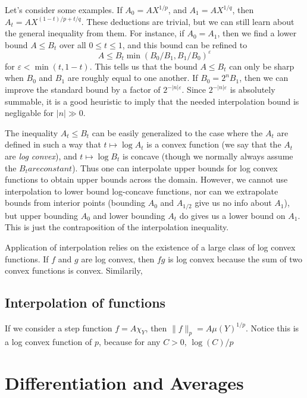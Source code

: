 Let's consider some examples. If $A_0 = AX^{1/p}$, and $A_1 = AX^{1/q}$, then $A_t = AX^{(1-t)/p + t/q}$. These deductions are trivial, but we can still learn about the general inequality from them. For instance, if $A_0 = A_1$, then we find a lower bound $A \leq B_t$ over all $0 \leq t \leq 1$, and this bound can be refined to
%
\[ A \leq B_t \min(B_0/B_1,B_1/B_0)^\varepsilon \]
%
for $\varepsilon < \min(t, 1-t)$. This tells us that the bound $A \leq B_t$ can only be sharp when $B_0$ and $B_1$ are roughly equal to one another. If $B_0 = 2^n B_1$, then we can improve the standard bound by a factor of $2^{-|n| \varepsilon}$. Since $2^{-|n| \varepsilon}$ is absolutely summable, it is a good heuristic to imply that the needed interpolation bound is negligable for $|n| \gg 0$.

The inequality $A_t \leq B_t$ can be easily generalized to the case where the $A_t$ are defined in such a way that $t \mapsto \log A_t$ is a convex function (we say that the $A_t$ are {\it log convex}), and $t \mapsto \log B_t$ is concave (though we normally always assume the $B_t are constant$). Thus one can interpolate upper bounds for log convex functions to obtain upper bounds across the domain. However, we cannot use interpolation to lower bound log-concave functions, nor can we extrapolate bounds from interior points (bounding $A_0$ and $A_{1/2}$ give us no info about $A_1$), but upper bounding $A_0$ and lower bounding $A_t$ do gives us a lower bound on $A_1$. This is just the contraposition of the interpolation inequality.

Application of interpolation relies on the existence of a large class of log convex functions. If $f$ and $g$ are log convex, then $fg$ is log convex because the sum of two convex functions is convex. Similarily,

\section{Interpolation of functions}

If we consider a step function $f = A \chi_Y$, then $\| f \|_p = A \mu(Y)^{1/p}$. Notice this is a log convex function of $p$, because for any $C > 0$, $\log(C)/p$









\chapter{Differentiation and Averages}

